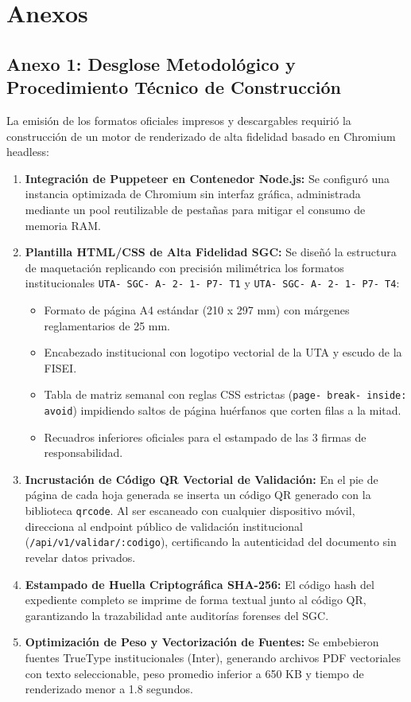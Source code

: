 \documentclass[12pt,a4paper]{article}
\begin{document}
\vspace{0.4cm}

\section{Anexos}

\subsection*{Anexo 1: Desglose Metodológico y Procedimiento Técnico de Construcción}
La emisión de los formatos oficiales impresos y descargables requirió la construcción de un motor de renderizado de alta fidelidad basado en Chromium headless:

\begin{enumerate}[leftmargin=1.5em, itemsep=3pt]
    \item \textbf{Integración de Puppeteer en Contenedor Node.js:} Se configuró una instancia optimizada de Chromium sin interfaz gráfica, administrada mediante un pool reutilizable de pestañas para mitigar el consumo de memoria RAM.
    \item \textbf{Plantilla HTML/CSS de Alta Fidelidad SGC:} Se diseñó la estructura de maquetación replicando con precisión milimétrica los formatos institucionales \texttt{UTA- SGC- A- 2- 1- P7- T1} y \texttt{UTA- SGC- A- 2- 1- P7- T4}:
    \begin{itemize}[leftmargin=1.2em, itemsep=2pt]
        \item Formato de página A4 estándar (210 x 297 mm) con márgenes reglamentarios de 25 mm.
        \item Encabezado institucional con logotipo vectorial de la UTA y escudo de la FISEI.
        \item Tabla de matriz semanal con reglas CSS estrictas (\texttt{page- break- inside: avoid}) impidiendo saltos de página huérfanos que corten filas a la mitad.
        \item Recuadros inferiores oficiales para el estampado de las 3 firmas de responsabilidad.
    \end{itemize}
    \item \textbf{Incrustación de Código QR Vectorial de Validación:} En el pie de página de cada hoja generada se inserta un código QR generado con la biblioteca \texttt{qrcode}. Al ser escaneado con cualquier dispositivo móvil, direcciona al endpoint público de validación institucional (\texttt{/\allowbreak  api/\allowbreak  v1/\allowbreak  validar/\allowbreak  :codigo}), certificando la autenticidad del documento sin revelar datos privados.
    \item \textbf{Estampado de Huella Criptográfica SHA-256:} El código hash del expediente completo se imprime de forma textual junto al código QR, garantizando la trazabilidad ante auditorías forenses del SGC.
    \item \textbf{Optimización de Peso y Vectorización de Fuentes:} Se embebieron fuentes TrueType institucionales (Inter), generando archivos PDF vectoriales con texto seleccionable, peso promedio inferior a 650 KB y tiempo de renderizado menor a 1.8 segundos.
\end{enumerate}
\end{document}
